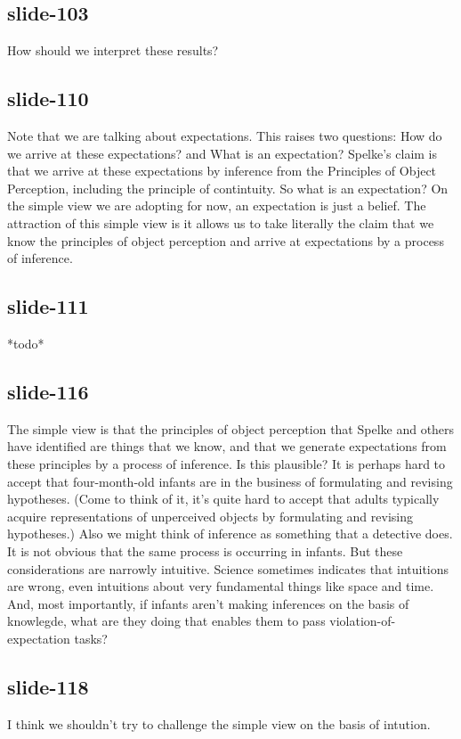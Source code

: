 \documentclass[12pt,\papersize]{extarticle}
\begin{document}
 
\subsection{slide-103}
How should we interpret these results?
 
 
\subsection{slide-110}
Note that we are talking about expectations.
This raises two questions: How do we arrive at these expectations? and What is an expectation?
Spelke's claim is that we arrive at these expectations by inference from the Principles of Object Perception, including the principle of contintuity.
So what is an expectation?
On the simple view we are adopting for now, an expectation is just a belief.
The attraction of this simple view is it allows us to take literally the claim that we know the principles of object perception and arrive at expectations by a process of inference.
 
 
\subsection{slide-111}
*todo*
 
 
\subsection{slide-116}
The simple view is that the principles of object perception that Spelke and others have identified are things that we know,
and that we generate expectations from these principles by a process of inference.
Is this plausible?
It is perhaps hard to accept that four-month-old infants are in the business of formulating and revising hypotheses.
(Come to think of it, it’s quite hard to accept that adults typically acquire representations of unperceived objects by formulating and revising hypotheses.)
Also we might think of inference as something that a detective does. It is not obvious that the same process is occurring in infants.
But these considerations are narrowly intuitive.
Science sometimes indicates that intuitions are wrong, even intuitions about very fundamental things like space and time.
And, most importantly, if infants aren’t making inferences on the basis of knowlegde, what are they doing that enables them to pass violation-of-expectation tasks?
 
 
\subsection{slide-118}
I think we shouldn't try to challenge the simple view on the basis of intution.
 
\end{document}
